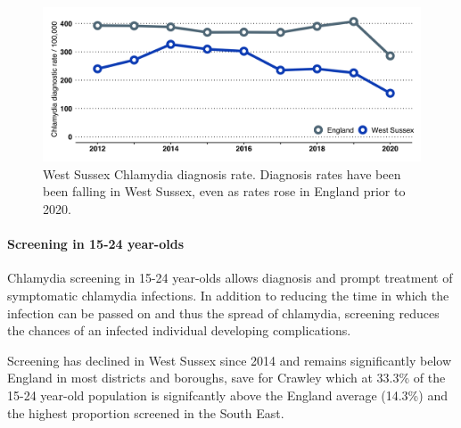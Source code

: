 \begin{figure}[ht]
    \caption{West Sussex Chlamydia diagnosis rate. Diagnosis rates have been been falling in West Sussex, even as rates rose in England prior to 2020.}\label{fig:ct_diagnosis}
    \centering
    \includegraphics[width = \linewidth]{images/ct_diag_line.png}
\end{figure}

\paragraph{Screening in 15-24 year-olds} Chlamydia screening in 15-24 year-olds allows diagnosis and prompt treatment of symptomatic chlamydia infections. In addition to reducing the time in which the infection can be passed on and thus the spread of chlamydia, screening reduces the chances of an infected individual developing complications.

Screening has declined in West Sussex since 2014 and remains significantly below England in most districts and boroughs, save for Crawley which at 33.3\% of the 15-24 year-old population is signifcantly above the England average (14.3\%) and the highest proportion screened in the South East.

